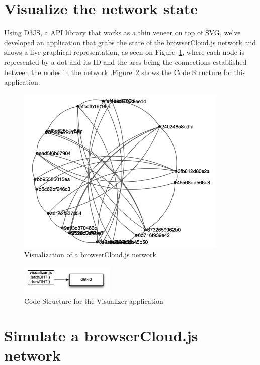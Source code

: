\section{Visualize the network state}

Using D3JS, a API library that works as a thin veneer on top of SVG, we've developed an application that grabs the state of the browserCloud.js network and shows a live graphical representation, as seen on Figure~\ref{fig:visualizer}, where each node is represented by a dot and its ID and the arcs being the connections established between the nodes in the network .Figure~\ref{fig:d-v} shows the Code Structure for this application.

\begin{figure}[h!]
  \centering
  \includegraphics[width=0.9\textwidth]{figs/visualizer}
  \caption{Visualization of a browserCloud.js network}
  \label{fig:visualizer}
\end{figure}

\begin{figure}[h!]
  \centering
  \includegraphics[width=0.4\textwidth]{figs/diagram-visualizer}
  \caption{Code Structure for the Visualizer application}
  \label{fig:d-v}
\end{figure}

\section{Simulate a browserCloud.js network}

